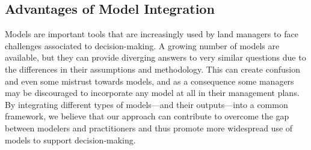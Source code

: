 \subsection*{Advantages of Model Integration}
Models are important tools that are increasingly used by land managers to face challenges associated to decision-making. 
A growing number of models are available, but they can provide diverging answers to very similar questions due to the differences in their assumptions and methodology. 
This can create confusion and even some mistrust towards models, and as a consequence some managers may be discouraged to incorporate any model at all in their management plans. 
By integrating different types of models---and their outputs---into a common framework, we believe that our approach can contribute to overcome the gap between modelers and practitioners and thus promote more widespread use of models to support decision-making.

